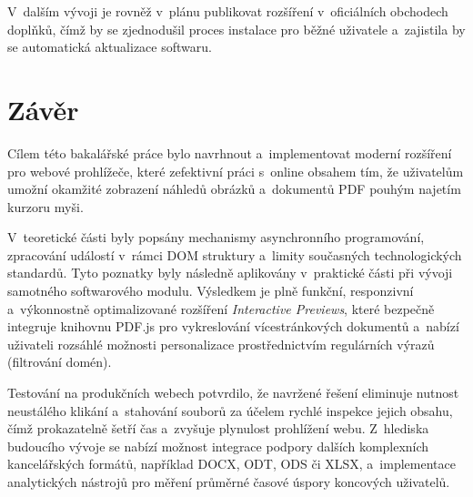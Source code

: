 \documentclass[a4paper,12pt]{article}
\begin{document}
V~dalším vývoji je rovněž v~plánu publikovat rozšíření v~oficiálních obchodech doplňků, čímž by se zjednodušil proces instalace pro běžné uživatele a~zajistila by se automatická aktualizace softwaru.


\section*{Závěr}

Cílem této bakalářské práce bylo navrhnout a~implementovat moderní rozšíření pro webové prohlížeče, které zefektivní práci s~online obsahem tím, že uživatelům umožní okamžité zobrazení náhledů obrázků a~dokumentů PDF pouhým najetím kurzoru myši.

V~teoretické části byly popsány mechanismy asynchronního programování, zpracování událostí v~rámci DOM struktury a~limity současných technologických standardů. Tyto poznatky byly následně aplikovány v~praktické části při vývoji samotného softwarového modulu. Výsledkem je plně funkční, responzivní a~výkonnostně optimalizované rozšíření \textit{Interactive Previews}, které bezpečně integruje knihovnu PDF.js pro vykreslování vícestránkových dokumentů a~nabízí uživateli rozsáhlé možnosti personalizace prostřednictvím regulárních výrazů (filtrování domén).

Testování na produkčních webech potvrdilo, že navržené řešení eliminuje nutnost neustálého klikání a~stahování souborů za účelem rychlé inspekce jejich obsahu, čímž prokazatelně šetří čas a~zvyšuje plynulost prohlížení webu. Z~hlediska budoucího vývoje se nabízí možnost integrace podpory dalších komplexních kancelářských formátů, například DOCX, ODT, ODS či XLSX, a~implementace analytických nástrojů pro měření průměrné časové úspory koncových uživatelů.




\ifVSKPusesBibLaTeX					%

\printbibliography

\else								%

\end{document}
